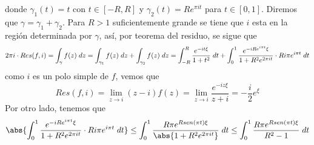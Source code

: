 \documentclass{article}
\begin{document}
\begin{enumerate}
\begin{center}
    \end{center}
    donde $\gamma_{1}(t)=t$ con $t\in[-R,R]$ y $\gamma_{2}(t)=Re^{\pi it}$ para $t\in[0,1]$. 
    Diremos que $\gamma=\gamma_{1}+\gamma_{2}$. Para $R>1$ suficientemente grande se tiene que 
    $i$ esta en la región determinada por $\gamma$, así, por teorema del residuo, se sigue que
    \begin{equation*}
        2\pi i\cdot Res(f,i)=\int_{\gamma}f(z)\hspace{1mm}dz=\int_{\gamma_{1}}f(z)\hspace{1mm}dz
        +\int_{\gamma_{2}}f(z)\hspace{1mm}dz=\int_{-R}^{R}\frac{e^{-it\xi}}{1+t^{2}}\hspace{1mm}dt
        +\int_{0}^{1}\frac{e^{-iRe^{i\pi t}\xi}}{1+R^{2}e^{2\pi it}}\cdot Ri\pi e^{i\pi t}
        \hspace{1mm}dt
    \end{equation*}
    como $i$ es un polo simple de $f$, vemos que
    \begin{equation*}
        Res(f,i)=\lim\limits_{z\to i}(z-i)f(z)=\lim\limits_{z\to i}\frac{e^{-iz\xi}}{z+i}
        =-\frac{i}{2}e^{\xi}
    \end{equation*}
    Por otro lado, tenemos que
    \begin{align*}
        \abs{\int_{0}^{1}\frac{e^{-iRe^{i\pi t}\xi}}{1+R^{2}e^{2\pi it}}\cdot Ri\pi e^{i\pi t}
        \hspace{1mm}dt}\leq\int_{0}^{1}\frac{R\pi e^{Rsen(\pi t)\xi}}{\abs{1+R^{2}e^{2\pi it}}}
        \hspace{1mm}dt\leq\int_{0}^{1}\frac{R\pi e^{Rsen(\pi t)\xi}}{R^{2}-1}\hspace{1mm}dt
    \end{align*}
    

\end{enumerate}
\end{document}
